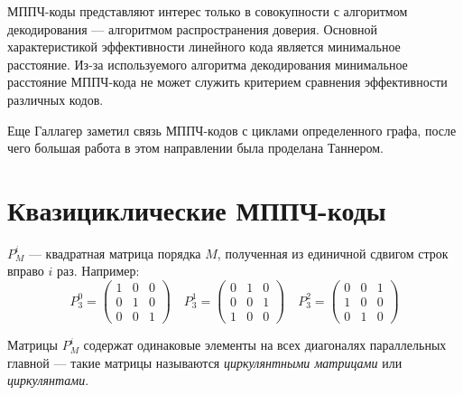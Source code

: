 МППЧ-коды представляют интерес только в совокупности с алгоритмом декодирования --- 
алгоритмом распространения доверия. Основной характеристикой эффективности линейного кода является
минимальное  расстояние. Из-за используемого алгоритма декодирования минимальное расстояние МППЧ-кода
не может служить критерием сравнения эффективности различных кодов.

Еще Галлагер заметил связь МППЧ-кодов с циклами определенного графа, после чего большая работа в этом
направлении была проделана Таннером.


\section{Квазициклические МППЧ-коды}

$P^i_M$ --- квадратная матрица порядка $M$, полученная из единичной сдвигом строк вправо $i$ раз. Например:
\[
P^0_3=
\begin{pmatrix}
	1 & 0 & 0 \\
	0 & 1 & 0 \\
	0 & 0 & 1
\end{pmatrix}
\quad
P^1_3=
\begin{pmatrix}
	0 & 1 & 0 \\
	0 & 0 & 1 \\
	1 & 0 & 0
\end{pmatrix}
\quad
P^2_3=
\begin{pmatrix}
	0 & 0 & 1 \\
	1 & 0 & 0 \\
	0 & 1 & 0
\end{pmatrix}
\] 

Матрицы $P^i_M$ содержат одинаковые элементы на всех диагоналях параллельных главной --- такие матрицы
называются \textit{циркулянтными матрицами} или \textit{циркулянтами}.

